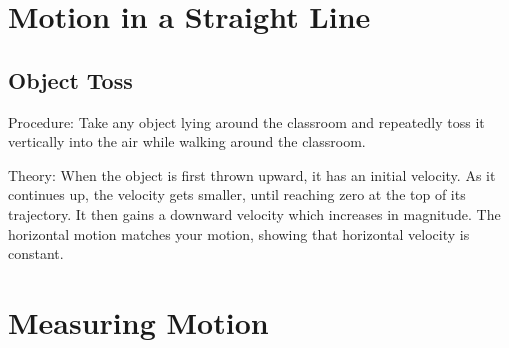 \section{Motion in a Straight Line} 

\begin{multicols}{2}




\subsection{Object Toss}


\begin{description*}
\item[Procedure:]{Take any object lying around the classroom and repeatedly toss it vertically into the air while walking around the classroom.}
\item[Theory:]{When the object is first thrown upward, it has an initial velocity. As it continues up, the velocity gets smaller, until reaching zero at the top of its trajectory. It then gains a downward velocity which increases in magnitude. The horizontal motion matches your motion, showing that horizontal velocity is constant.}
\end{description*}


\section*{Measuring Motion}



\end{multicols}
